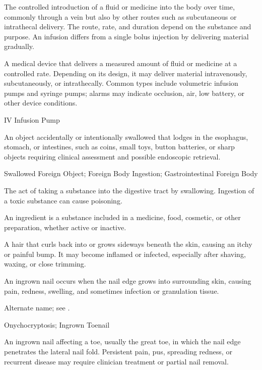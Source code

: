  The controlled introduction of a fluid or medicine into the body over
time, commonly through a vein but also by other routes such as subcutaneous or intrathecal
delivery. The route, rate, and duration depend on the substance and purpose. An infusion
differs from a single bolus injection by delivering material gradually.

 A medical device that delivers a measured amount of fluid or medicine at a controlled rate. Depending on its design, it may deliver material intravenously, subcutaneously, or intrathecally. Common types include volumetric infusion pumps and syringe pumps; alarms may indicate occlusion, air, low battery, or other device conditions.

\synonyms
IV Infusion Pump

 An object accidentally or intentionally swallowed that lodges in the esophagus, stomach, or intestines, such as coins, small toys, button batteries, or sharp objects requiring clinical assessment and possible endoscopic retrieval.

\synonyms
Swallowed Foreign Object; Foreign Body Ingestion; Gastrointestinal Foreign Body

 The act of taking a substance into the digestive tract by swallowing. Ingestion of a toxic substance can cause poisoning.

 An ingredient is a substance included in a medicine, food, cosmetic, or other preparation, whether active or inactive.

 A hair that curls back into or grows sideways beneath the skin, causing an itchy or painful bump. It may become inflamed or infected, especially after shaving, waxing, or close trimming.

 An ingrown nail occurs when the nail edge grows into surrounding skin, causing pain, redness, swelling, and sometimes infection or granulation tissue.

 Alternate name; see
  .

\synonyms
Onychocryptosis; Ingrown Toenail

 An ingrown nail affecting a toe, usually the great toe, in which the nail edge penetrates the lateral nail fold. Persistent pain, pus, spreading redness, or recurrent disease may require clinician treatment or partial nail removal.

